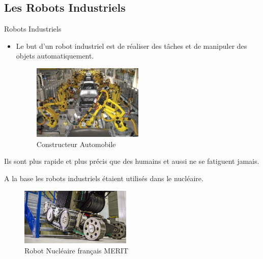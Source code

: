 \documentclass{beamer}
\begin{document}
\subsection{Les Robots Industriels}
\begin{frame}{Robots Industriels}

\begin{itemize}
    \item Le but d'un robot industriel est de réaliser des tâches et de manipuler des objets automatiquement. 
    \begin{figure}
        \centering
        \includegraphics[width=200]{img/auto.png}
        \caption{Constructeur Automobile}
        \label{fig:my_label}
    \end{figure}
    
\end{itemize}
\end{frame}

\begin{frame}
\item Ils sont plus rapide et plus précis que des humains et aussi ne se fatiguent jamais. 
\item A la base les robots industriels étaient utilisés dans le nucléaire. \begin{figure}
        \centering
        \includegraphics[width=200]{img/nucl.png}
        \caption{Robot Nucléaire français MERIT}
        \label{fig:my_label}
    \end{figure}
    
\end{frame}
\end{document}
